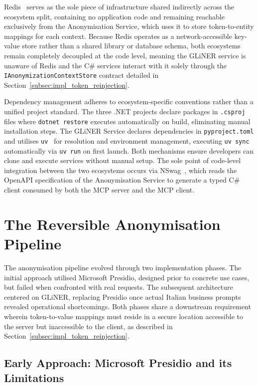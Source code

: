 Redis~\cite{redis2009} serves as the sole piece of infrastructure shared indirectly across the ecosystem split, containing no application code and remaining reachable exclusively from the Anonymisation Service, which uses it to store token-to-entity mappings for each context. Because Redis operates as a network-accessible key-value store rather than a shared library or database schema, both ecosystems remain completely decoupled at the code level, meaning the GLiNER service is unaware of Redis and the C\# services interact with it solely through the \texttt{IAnonymizationContextStore} contract detailed in Section~\ref{subsec:impl_token_reinjection}.

Dependency management adheres to ecosystem-specific conventions rather than a unified project standard. The three .NET projects declare packages in \texttt{.csproj} files where \texttt{dotnet restore} executes automatically on build, eliminating manual installation steps. The GLiNER Service declares dependencies in \texttt{pyproject.toml} and utilises \texttt{uv}~\cite{astral2024uv} for resolution and environment management, executing \texttt{uv sync} automatically via \texttt{uv run} on first launch. Both mechanisms ensure developers can clone and execute services without manual setup. The sole point of code-level integration between the two ecosystems occurs via NSwag~\cite{nswag2015}, which reads the OpenAPI specification of the Anonymisation Service to generate a typed C\# client consumed by both the MCP server and the MCP client.

\section{The Reversible Anonymisation Pipeline}
\label{sec:impl_anonymization_pipeline}

The anonymisation pipeline evolved through two implementation phases. The initial approach utilised Microsoft Presidio, designed prior to concrete use cases, but failed when confronted with real requests. The subsequent architecture centered on GLiNER, replacing Presidio once actual Italian business prompts revealed operational shortcomings. Both phases share a downstream requirement wherein token-to-value mappings must reside in a secure location accessible to the server but inaccessible to the client, as described in Section~\ref{subsec:impl_token_reinjection}.

\subsection{Early Approach: Microsoft Presidio and its Limitations}
\label{subsec:impl_presidio}

